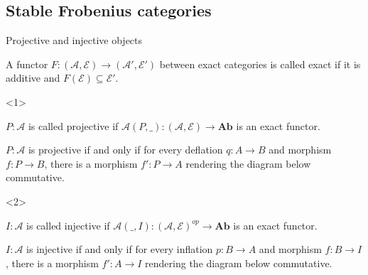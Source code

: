 \documentclass{beamer}
\begin{document}
        \subsection{Stable Frobenius categories}
            \begin{frame}{Projective and injective objects}
                \begin{definition}
                    A functor $F:(\mathcal{A},\mathcal{E})\rightarrow (\mathcal{A}',\mathcal{E}')$ between exact categories is called exact if it is additive and $F(\mathcal{E})\subseteq \mathcal{E}'$.
                \end{definition}
                \begin{onlyenv}<1>
                    \begin{definition}
                        $P:\mathcal{A}$ is called projective if $\mathcal{A}(P,\_):(\mathcal{A},\mathcal{E})\rightarrow \textbf{Ab}$ is an exact functor.
                    \end{definition}
                    \begin{lemma}
                        $P:\mathcal{A}$ is projective if and only if for every deflation $q:A\rightarrow B$ and morphism $f:P\rightarrow B$, there is a morphism $f':P\rightarrow A$ rendering the diagram below commutative.
                        \begin{center}
                        \end{center}
                    \end{lemma}
                \end{onlyenv}
                \begin{onlyenv}<2>
                    \begin{definition}
                        $I:\mathcal{A}$ is called injective if $\mathcal{A}(\_,I):(\mathcal{A},\mathcal{E})^{op}\rightarrow \textbf{Ab}$ is an exact functor.
                    \end{definition}
                    \begin{lemma}
                        $I:\mathcal{A}$ is injective if and only if for every inflation $p:B\rightarrow A$ and morphism $f:B\rightarrow I$, there is a morphism $f':A\rightarrow I$ rendering the diagram below commutative.

\end{lemma}
\end{onlyenv}
\end{frame}
\end{document}
